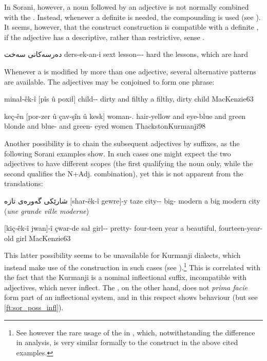 \largerpage
In Sorani, however, a \prim noun followed by an adjective is not normally combined with the  . Instead, whenever a definite \prim is needed, the compounding \ez* is used (see ). It seems, however, that the construct \ez* construction is compatible with a definite \prim, if the adjective has a descriptive, rather than restrictive, sense \citep[see][12, fn.~1]{ThackstonSorani}. 

{دەرسەكانی سەخت}
{ders-ek-an-i sext}
{lesson--\pl-\ez{} hard}
{the lessons, which are hard}
{\citep[12]{ThackstonSorani}}\antipar 

\newpage 

Whenever a \prim is modified by more than one adjective, several alternative patterns are available. The adjectives may be conjoined to form one \secn phrase:

{minał-êk-î [pîs û poxił]}
{child-\indef-\ez{} dirty and filthy}
{a filthy, dirty child}
{MacKenzie}{63}

{keç-ên [por-zer û çav-şîn û kesk]}
{woman-\ez.\pl{} hair-yellow and eye-blue and green}
{blonde and blue- and green- eyed women}
{ThackstonKurmanji}{98}

Another possibility is to chain the subsequent adjectives by \ez* suffixes, as the following Sorani examples show. In such cases one might expect the two adjectives to have  different scopes (the first qualifying the \prim noun only, while the second qualifies the N+Adj. combination), yet this is not apparent from the translations:

{شارێكی گەورەی تازە}
{[shar-êk-î gewre]-y taze}
{city-\indef-\ez{} big-\ez{} modern}
{a big modern city (\textit{une grande ville moderne})}
{\citep[60]{BlauSorani}}

{[kiç-êk-î jwan]-î çwar-de \cb{}sał}
{girl-\indef-\ez{} pretty-\ez{} four-teen \cb{}year}
{a beautiful, fourteen-year-old girl}
{MacKenzie}{63}

\largerpage
This latter possibility seems to be unavailable for Kurmanji dialects, which instead make use of the \lnk* \ez* construction  in such cases (see ).\footnote{See however the rare usage of the \Kur \lnk* \ez* {} in , which, notwithstanding the difference in analysis, is very similar formally to the construct \ez* in  the  above cited \Sor examples.}  
This is correlated with the fact that the Kurmanji \ez* is a nominal inflectional suffix, incompatible with adjectives, which never inflect. The \Sor \ez*, on the other hand, does not \emph{prima facie} form part of an inflectional system, and in this respect shows  behaviour (but see \vref{ft:sor_poss_infl}). 



